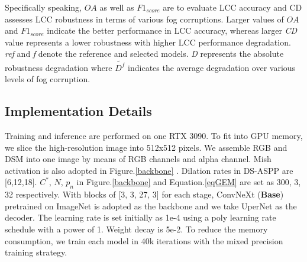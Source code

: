 \documentclass[lettersize,journal]{IEEEtran}
\begin{document}
Specifically speaking,  \emph{$OA$} as well as \emph{$F1_{score}$} are to evaluate LCC accuracy and CD assesses LCC robustness in terms of various fog corruptions. Larger values of \emph{$OA$} and \emph{$F1_{score}$} indicate the better performance in LCC accuracy, whereas larger \emph{CD} value represents a lower robustness with higher LCC performance degradation. \emph{ref} and \emph{f} denote the reference and selected models. \emph{D} represents the absolute robustness degradation where $\widetilde{D^{f}}$ indicates the average degradation over various levels of fog corruption. 

\subsection{Implementation Details}
Training and inference are performed on one RTX 3090. To fit into GPU memory, we slice the high-resolution image into 512x512 pixels. 
We assemble RGB and DSM into one image by means of RGB channels and alpha channel. Mish activation is also adopted in Figure.\ref{backbone} \cite{Misra2020MishAS}. Dilation rates in DS-ASPP are [6,12,18]. $C^{*}$, $N$, $p_{n}$ in Figure.\ref{backbone} and Equation.\eqref{eqGEM} are set as 300, 3, 32 respectively. 
 With blocks of [3, 3, 27, 3] for each stage, ConvNeXt (\textbf{Base}) pretrained on ImageNet is adopted as the backbone and we take UperNet as the decoder. The learning rate is set initially as 1e-4 using a poly learning rate schedule with a power of 1. Weight decay is 5e-2. To reduce the memory consumption, we  train each model in 40k iterations with the mixed precision training strategy. 
\end{document}
